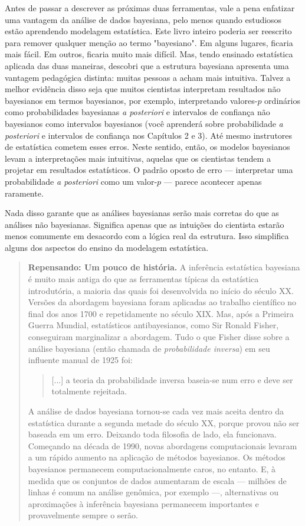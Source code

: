 Antes de passar a descrever as próximas duas ferramentas, vale a pena enfatizar uma vantagem da análise de dados bayesiana, pelo menos quando estudiosos estão aprendendo modelagem estatística. Este livro inteiro poderia ser reescrito para remover qualquer menção ao termo "bayesiano". Em alguns lugares, ficaria mais fácil. Em outros, ficaria muito mais difícil. Mas, tendo ensinado estatística aplicada das duas maneiras, descobri que a estrutura bayesiana apresenta uma vantagem pedagógica distinta: muitas pessoas a acham mais intuitiva. Talvez a melhor evidência disso seja que muitos cientistas interpretam resultados não bayesianos em termos bayesianos, por exemplo, interpretando valores-$p$ ordinários como probabilidades bayesianas \textit{a posteriori} e intervalos de confiança não bayesianos como intervalos bayesianos (você aprenderá sobre probabilidade \textit{a posteriori} e intervalos de confiança nos Capítulos 2 e 3). Até mesmo instrutores de estatística cometem esses erros. Neste sentido, então, os modelos bayesianos levam a interpretações mais intuitivas, aquelas que os cientistas tendem a projetar em resultados estatísticos. O padrão oposto de erro — interpretar uma probabilidade \textit{a posteriori} como um valor-$p$ — parece acontecer apenas raramente.

Nada disso garante que as análises bayesianas serão mais corretas do que as análises não bayesianas. Significa apenas que as intuições do cientista estarão menos comumente em desacordo com a lógica real da estrutura. Isso simplifica alguns dos aspectos do ensino da modelagem estatística.

\begin{quote}
  \textbf{Repensando: Um pouco de história.} A inferência estatística bayesiana é muito mais antiga do que as ferramentas típicas da estatística introdutória, a maioria das quais foi desenvolvida no início do século XX. Versões da abordagem bayesiana foram aplicadas ao trabalho científico no final dos anos 1700 e repetidamente no século XIX. Mas, após a Primeira Guerra Mundial, estatísticos antibayesianos, como Sir Ronald Fisher, conseguiram marginalizar a abordagem. Tudo o que Fisher disse sobre a análise bayesiana (então chamada de \textit{probabilidade inversa}) em seu influente manual de 1925 foi:

  \begin{quote}
    [...] a teoria da probabilidade inversa baseia-se num erro e deve ser totalmente rejeitada.
  \end{quote}

  A análise de dados bayesiana tornou-se cada vez mais aceita dentro da estatística durante a segunda metade do século XX, porque provou não ser baseada em um erro. Deixando toda filosofia de lado, ela funcionava. Começando na década de 1990, novas abordagens computacionais levaram a um rápido aumento na aplicação de métodos bayesianos. Os métodos bayesianos permanecem computacionalmente caros, no entanto. E, à medida que os conjuntos de dados aumentaram de escala — milhões de linhas é comum na análise genômica, por exemplo —, alternativas ou aproximações à inferência bayesiana permanecem importantes e provavelmente sempre o serão.
\end{quote}

